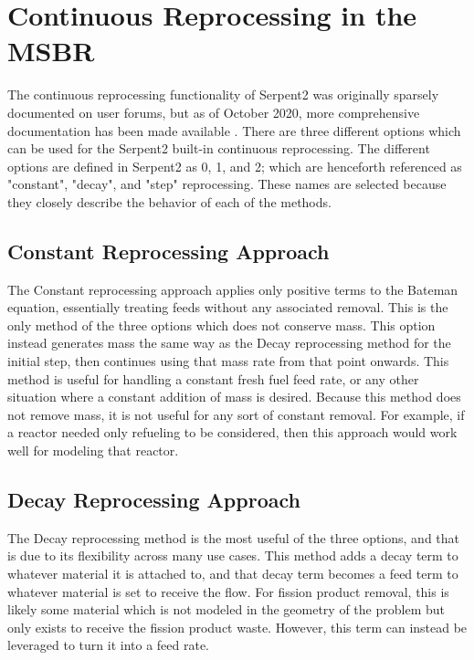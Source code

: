 \section{Continuous Reprocessing in the MSBR}

The continuous reprocessing functionality of Serpent2 was originally sparsely documented on user forums, but as of October 2020, more comprehensive documentation has been made available \cite{seifert_material_2020}.
There are three different options which can be used for the Serpent2 built-in continuous reprocessing. The different options are defined in Serpent2 as 0, 1, and 2; which are henceforth referenced as "constant", "decay", and "step" reprocessing. These names are selected because they closely describe the behavior of each of the methods.

\subsection{Constant Reprocessing Approach}
The Constant reprocessing approach applies only positive terms to the Bateman equation, essentially treating feeds without any associated removal.
This is the only method of the three options which does not conserve mass. This option instead generates mass the same way as the Decay reprocessing method for the initial step, then continues using that mass rate from that point onwards.
This method is useful for handling a constant fresh fuel feed rate, or any other situation where a constant addition of mass is desired. Because this method does not remove mass, it is not useful for any sort of constant removal.
For example, if a reactor needed only refueling to be considered, then this approach would work well for modeling that reactor.

\subsection{Decay Reprocessing Approach}
The Decay reprocessing method is the most useful of the three options, and that is due to its flexibility across many use cases. This method adds a decay term to whatever material it is attached to, and that decay term becomes a feed term to whatever material is set to receive the flow. For fission product removal, this is likely some material which is not modeled in the geometry of the problem but only exists to receive the fission product waste. However, this term can instead be leveraged to turn it into a feed rate.

